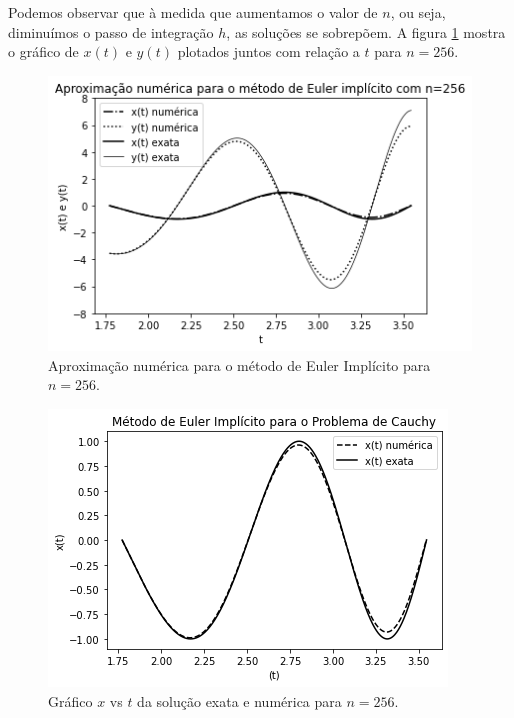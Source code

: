 \documentclass[amsmath,amssymb,floatfix]{revtex4}
\begin{document}
Podemos observar que à medida que aumentamos o valor de $n$, ou seja, diminuímos o passo de integração $h$, as soluções se sobrepõem. A figura \ref{exatanumI} mostra o gráfico de $x(t)$ e $y(t)$ plotados juntos com relação a $t$ para $n=256$. 
\begin{figure}[H]
\centering
\includegraphics[scale=0.56]{exata_num_x_yI}
\caption{Aproximação numérica para o método de Euler Implícito para $n=256$.}
\label{exatanumI}
\end{figure}

\begin{figure}[H]
\centering
\includegraphics[scale=0.56]{implx_num_exata}
\caption{Gráfico $x$ vs $t$ da solução exata e numérica para $n=256$.}
\label{implx}
\end{figure}
\end{document}
